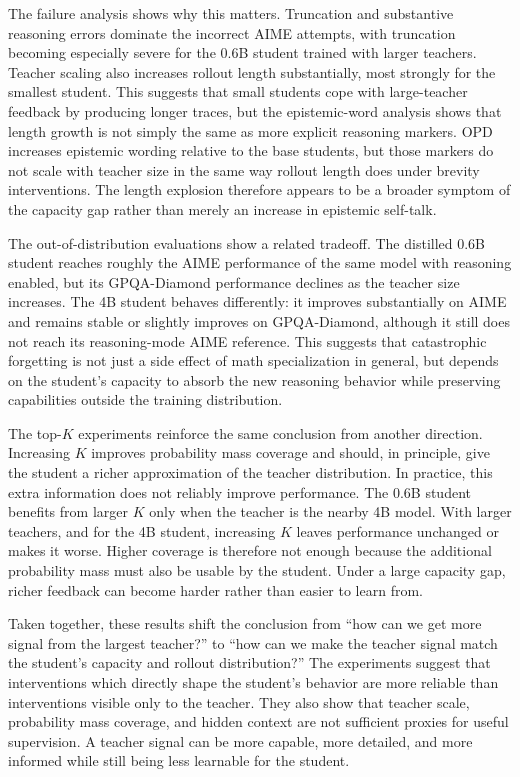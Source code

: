 The failure analysis shows why this matters. Truncation and substantive reasoning errors dominate the incorrect AIME attempts, with truncation becoming especially severe for the 0.6B student trained with larger teachers. Teacher scaling also increases rollout length substantially, most strongly for the smallest student. This suggests that small students cope with large-teacher feedback by producing longer traces, but the epistemic-word analysis shows that length growth is not simply the same as more explicit reasoning markers. OPD increases epistemic wording relative to the base students, but those markers do not scale with teacher size in the same way rollout length does under brevity interventions. The length explosion therefore appears to be a broader symptom of the capacity gap rather than merely an increase in epistemic self-talk.

The out-of-distribution evaluations show a related tradeoff. The distilled 0.6B student reaches roughly the AIME performance of the same model with reasoning enabled, but its GPQA-Diamond performance declines as the teacher size increases. The 4B student behaves differently: it improves substantially on AIME and remains stable or slightly improves on GPQA-Diamond, although it still does not reach its reasoning-mode AIME reference. This suggests that catastrophic forgetting is not just a side effect of math specialization in general, but depends on the student's capacity to absorb the new reasoning behavior while preserving capabilities outside the training distribution.

The top-$K$ experiments reinforce the same conclusion from another direction. Increasing $K$ improves probability mass coverage and should, in principle, give the student a richer approximation of the teacher distribution. In practice, this extra information does not reliably improve performance. The 0.6B student benefits from larger $K$ only when the teacher is the nearby 4B model. With larger teachers, and for the 4B student, increasing $K$ leaves performance unchanged or makes it worse. Higher coverage is therefore not enough because the additional probability mass must also be usable by the student. Under a large capacity gap, richer feedback can become harder rather than easier to learn from.

Taken together, these results shift the conclusion from ``how can we get more signal from the largest teacher?'' to ``how can we make the teacher signal match the student's capacity and rollout distribution?'' The experiments suggest that interventions which directly shape the student's behavior are more reliable than interventions visible only to the teacher. They also show that teacher scale, probability mass coverage, and hidden context are not sufficient proxies for useful supervision. A teacher signal can be more capable, more detailed, and more informed while still being less learnable for the student.

